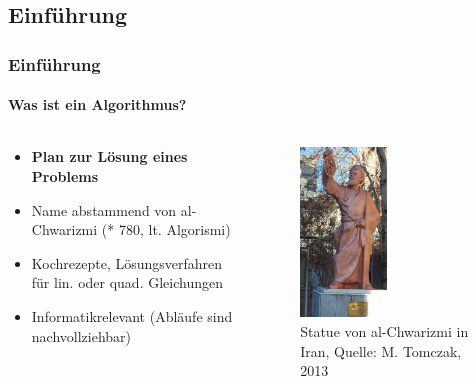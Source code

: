 \documentclass[professionalfont,serif,german]{beamer}
\begin{document}
\begin{frame}
  \section[Einführung in Algorithmen und Pathfinder]{Einführung}
  \frametitle{Einführung}
  \framesubtitle{Was ist ein Algorithmus?}
  \begin{columns}[c] %
    \begin{column}[T]{.5\textwidth} %
      \begin{itemize}
        \item \textbf{Plan zur Lösung eines Problems}
        \item Name abstammend von al-Chwarizmi (* 780, lt. Algorismi)
        \item Kochrezepte, Lösungsverfahren für lin. oder quad. Gleichungen
        \item Informatikrelevant (Abläufe sind nachvollziehbar)
      \end{itemize}
    \end{column}
    \begin{column}[T]{.5\textwidth}
      \begin{figure}
        \includegraphics[height=4.5cm]{img/algorismi.png}
        \caption{Statue von al-Chwarizmi in Iran, Quelle: M. Tomczak, 2013}
      \end{figure}
    \end{column}
  \end{columns}
\end{frame}
\end{document}
